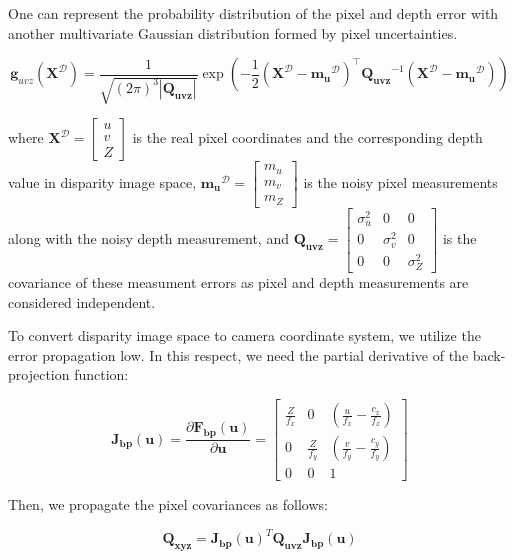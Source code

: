 \documentclass[a4paper]{report}
\numberwithin{figure}{section}
\begin{document}
One can represent the probability distribution of the pixel and depth error
with another multivariate Gaussian distribution formed by pixel uncertainties. 

\begin{equation} \mathbf{g}_{uvz}(\mathbf{X}^{\mathcal{D}}) =
\frac{1}{\sqrt{(2\pi)^3|\mathbf{Q_{uvz}}|}} \exp(-\frac{1}{2}
(\mathbf{X}^{\mathcal{D}}-\mathbf{m_u}^{\mathcal{D}})^\intercal
\mathbf{Q_{uvz}}^{-1} (\mathbf{X}^{\mathcal{D}}-\mathbf{m_u}^{\mathcal{D}}))
\end{equation} \label{eq:cov_ellipse}

where $\mathbf{X}^{\mathcal{D}} = \begin{bmatrix} u \\ v \\ Z\end{bmatrix}$ is
the real pixel coordinates and the corresponding depth value in disparity image
space, $\mathbf{m_u}^{\mathcal{D}} = \begin{bmatrix} m_u \\ m_v \\ m_Z
\end{bmatrix}$ is the noisy pixel measurements along with the noisy depth
measurement, and $\mathbf{Q_{uvz}} = \begin{bmatrix} \sigma_u^2 & 0 & 0\\ 0 &
\sigma_v^2 & 0 \\ 0 & 0 & \sigma_Z^2\end{bmatrix}$ is the covariance of these
measument errors as pixel and depth measurements are considered independent.

To convert disparity image space to camera coordinate system, we utilize the
error propagation low. In this respect, we need the partial derivative of the
back-projection function:

\begin{equation} \label{eq:jacob_back_proj}
  \mathbf{J_{bp}}(\mathbf{u}) = \frac{\partial
\mathbf{F_{bp}}(\mathbf{u})}{\partial \mathbf{u}}  = \begin{bmatrix}
\frac{Z}{f_x} & 0 & (\frac{u}{f_x} - \frac{c_x}{f_x}) \\ 0 & \frac{Z}{f_y} &
(\frac{v}{f_y} - \frac{c_y}{f_y}) \\ 0 & 0 & 1 \end{bmatrix} \end{equation}

Then, we propagate the pixel covariances as follows:

\begin{equation} \mathbf{Q_{xyz}} = \mathbf{J_{bp}}(\mathbf{u})^T
\mathbf{Q_{uvz}} \mathbf{J_{bp}}(\mathbf{u}) \end{equation}
\end{document}

